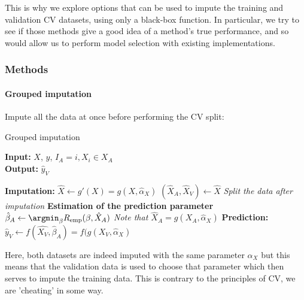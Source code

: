 This is why we explore options that can be used to impute the training and validation CV datasets, using only a black-box function. In particular, we try to see if those methods give a good idea of a method's true performance, and so would allow us to perform model selection with existing implementations.

			\subsubsection{Methods}

\paragraph{Grouped imputation} 

Impute all the data at once before performing the CV split:
\begin{algorithm}[H]
	\caption{Grouped imputation}
	\hspace*{\algorithmicindent} \textbf{Input:} $X$, $y$, $I_A={i, X_i \in X_A}$  \\
 	\hspace*{\algorithmicindent} \textbf{Output:} $\hat{y}_V$
	\begin{algorithmic}[1]
		\State \textbf{Imputation:}
		\Indstate $\hat{X} \leftarrow g'(X) = g(X, \hat{\alpha}_X)$ 
		\Indstate $(\hat{X}_A, \hat{X}_V) \leftarrow \hat{X}$ \Comment \emph{Split the data after imputation}
		\State \textbf{Estimation of the prediction parameter}
		\Indstate $\hat{\beta}_A \leftarrow \argmin_{\beta} R_{\text{emp}}(\beta,\hat{X}_A)$ \Comment \emph{Note that $\hat{X}_A = g(X_A, \hat{\alpha}_X)$}
		\State \textbf{Prediction:}
		\Indstate $\hat{y}_V \leftarrow f(\hat{X_V}, \hat{\beta}_A) = f(g(X_V, \hat{\alpha}_X)$
	\end{algorithmic}
\end{algorithm}

Here, both datasets are indeed imputed with the same parameter $\alpha_X$ but this means that the validation data is used to choose that parameter which then serves to impute the training data. This is contrary to the principles of CV, we are 'cheating' in some way.

